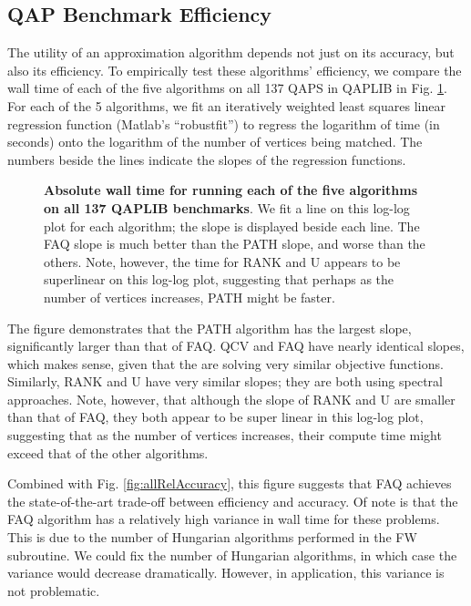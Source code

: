 \documentclass[10pt]{article}
\begin{document}
\subsection{QAP Benchmark Efficiency} 
\label{sub:efficiency}


The utility of an approximation algorithm depends not just on its accuracy, but also its efficiency.
To empirically test these algorithms' efficiency, we compare the wall time of each of the five algorithms on all 137 QAPS in QAPLIB in Fig. \ref{fig:allEfficiency}.  For each of the 5 algorithms, we fit an iteratively weighted least squares linear regression function (Matlab's ``robustfit'') to regress the logarithm of time (in seconds) onto the logarithm of the number of vertices being matched.  The numbers beside the lines indicate the slopes of the regression functions.  

\begin{figure}[htbp]
	\centering
	\caption{{\bf Absolute wall time for running each of the five algorithms on all 137 QAPLIB benchmarks}. We fit a line on this log-log plot for each algorithm; the slope is displayed beside each line. The FAQ slope is much better than the PATH slope, and worse than the others.  Note, however, the time for RANK and U appears to be superlinear on this log-log plot, suggesting that perhaps as the number of vertices increases, PATH might be faster. }
	\label{fig:allEfficiency}
\end{figure}
The figure demonstrates that the PATH algorithm has the largest slope, significantly larger than that of FAQ.  QCV and FAQ have nearly identical slopes, which makes sense, given that the are solving very similar objective functions.  Similarly, RANK and U have very similar slopes; they are both using spectral approaches.  Note, however, that although the slope of RANK and U are smaller than that of FAQ, they both appear to be super linear in this log-log plot, suggesting that as the number of vertices increases, their compute time might exceed that of the other algorithms.  

Combined with Fig. \ref{fig:allRelAccuracy}, this figure suggests that FAQ achieves the state-of-the-art trade-off between efficiency and accuracy.  
Of note is that the FAQ algorithm has a relatively high variance in wall time for these problems.  This is due to the number of Hungarian algorithms performed in the FW subroutine.  We could fix the number of Hungarian algorithms, in which case the variance would decrease dramatically.  However, in application, this variance is not problematic.
\end{document}
